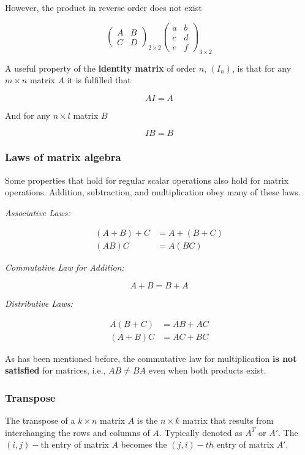 \documentclass[a4paper,11pt]{article}
\theoremstyle{definition}
\theoremstyle{plain}
\begin{document}
However, the product in reverse order does not exist

\[
\begin{pmatrix} A & B \\ C & D \end{pmatrix}_{2\times 2} \begin{pmatrix} a & b \\ c & d \\ e & f \end{pmatrix}_{3\times 2}
\]

A useful property of the \textbf{identity matrix} of order \(n\),
\((I_n)\), is that for any \(m\times n\) matrix \(A\) it is fulfilled
that

\[
AI = A
\]

And for any \(n\times l\) matrix \(B\)

\[
IB = B
\]

\subsubsection{Laws of matrix algebra}\label{laws-of-matrix-algebra}

Some properties that hold for regular scalar operations also hold for
matrix operations. Addition, subtraction, and multiplication obey many
of these laws.

\emph{Associative Laws:}

\begin{align*}
(A + B) + C &= A + (B + C) \\
(AB)C &= A(BC)
\end{align*}

\emph{Commutative Law for Addition:}

\[
A + B = B + A
\]

\emph{Distributive Laws:}

\begin{align*}
A(B + C) &= AB + AC \\
(A + B)C &= AC + BC
\end{align*}

As has been mentioned before, the commutative law for multiplication
\textbf{is not satisfied} for matrices, i.e., \(AB \neq BA\) even when
both products exist.

\subsubsection{Transpose}\label{transpose}

The transpose of a \(k\times n\) matrix \(A\) is the \(n\times k\)
matrix that results from interchanging the rows and columns of \(A\).
Typically denoted as \(A^T\) or \(A'\). The \((i, j)-\)th entry of
matrix \(A\) becomes the \((j, i)-th\) entry of matrix \(A'\).
\end{document}
